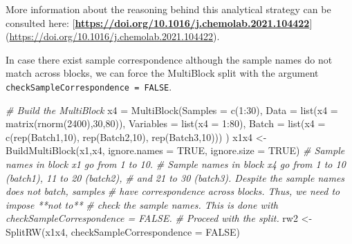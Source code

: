\documentclass[
]{book}
\newenvironment{Shaded}{\begin{snugshade}}{\end{snugshade}}
\newcommand{\AttributeTok}[1]{\textcolor[rgb]{0.77,0.63,0.00}{#1}}
\newcommand{\CommentTok}[1]{\textcolor[rgb]{0.56,0.35,0.01}{\textit{#1}}}
\newcommand{\ConstantTok}[1]{\textcolor[rgb]{0.00,0.00,0.00}{#1}}
\newcommand{\DecValTok}[1]{\textcolor[rgb]{0.00,0.00,0.81}{#1}}
\newcommand{\FunctionTok}[1]{\textcolor[rgb]{0.00,0.00,0.00}{#1}}
\newcommand{\NormalTok}[1]{#1}
\newcommand{\OtherTok}[1]{\textcolor[rgb]{0.56,0.35,0.01}{#1}}
\newcommand{\SpecialCharTok}[1]{\textcolor[rgb]{0.00,0.00,0.00}{#1}}
\newcommand{\StringTok}[1]{\textcolor[rgb]{0.31,0.60,0.02}{#1}}
\begin{document}
More information about the reasoning behind this analytical strategy can be
consulted here: {[}\textbf{\url{https://doi.org/10.1016/j.chemolab.2021.104422}}{]}
(\url{https://doi.org/10.1016/j.chemolab.2021.104422}).

In case there exist sample correspondence although the sample names do not match
across blocks, we can force the MultiBlock split with the argument
\texttt{checkSampleCorrespondence\ =\ FALSE}.

\begin{Shaded}
\begin{Highlighting}[]
\CommentTok{\# Build the MultiBlock}
\NormalTok{x4 }\OtherTok{=} \FunctionTok{MultiBlock}\NormalTok{(}\AttributeTok{Samples =} \FunctionTok{c}\NormalTok{(}\DecValTok{1}\SpecialCharTok{:}\DecValTok{30}\NormalTok{),}
                \AttributeTok{Data =} \FunctionTok{list}\NormalTok{(}\AttributeTok{x4 =} \FunctionTok{matrix}\NormalTok{(}\FunctionTok{rnorm}\NormalTok{(}\DecValTok{2400}\NormalTok{),}\DecValTok{30}\NormalTok{,}\DecValTok{80}\NormalTok{)),}
                \AttributeTok{Variables =} \FunctionTok{list}\NormalTok{(}\AttributeTok{x4 =} \DecValTok{1}\SpecialCharTok{:}\DecValTok{80}\NormalTok{),}
                \AttributeTok{Batch =} \FunctionTok{list}\NormalTok{(}\AttributeTok{x4 =} \FunctionTok{c}\NormalTok{(}\FunctionTok{rep}\NormalTok{(}\StringTok{\textquotesingle{}Batch1\textquotesingle{}}\NormalTok{,}\DecValTok{10}\NormalTok{),}
                                    \FunctionTok{rep}\NormalTok{(}\StringTok{\textquotesingle{}Batch2\textquotesingle{}}\NormalTok{,}\DecValTok{10}\NormalTok{),}
                                    \FunctionTok{rep}\NormalTok{(}\StringTok{\textquotesingle{}Batch3\textquotesingle{}}\NormalTok{,}\DecValTok{10}\NormalTok{)))}
\NormalTok{)}
\NormalTok{x1x4 }\OtherTok{\textless{}{-}} \FunctionTok{BuildMultiBlock}\NormalTok{(x1,x4, }\AttributeTok{ignore.names =} \ConstantTok{TRUE}\NormalTok{, }\AttributeTok{ignore.size =} \ConstantTok{TRUE}\NormalTok{)}
  \CommentTok{\# Sample names in block x1 go from 1 to 10.}
  \CommentTok{\# Sample names in block x4 go from 1 to 10 (batch1), 11 to 20 (batch2),}
  \CommentTok{\# and 21 to 30 (batch3). Despite the sample names does not batch, samples}
  \CommentTok{\# have correspondence across blocks. Thus, we need to impose **not to**}
  \CommentTok{\# check the sample names. This is done with checkSampleCorrespondence = FALSE.}
\CommentTok{\# Proceed with the split.}
\NormalTok{rw2 }\OtherTok{\textless{}{-}} \FunctionTok{SplitRW}\NormalTok{(x1x4, }\AttributeTok{checkSampleCorrespondence =} \ConstantTok{FALSE}\NormalTok{)}
\end{Highlighting}
\end{Shaded}
\end{document}
